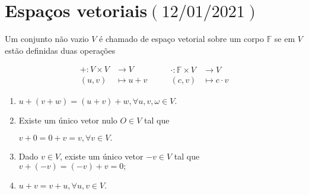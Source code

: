 \chapter{Espaços vetoriais\quad$\left(12/01/2021\right)$}

\begin{definition}
	Um conjunto não vazio $V$ é chamado de espaço vetorial sobre um corpo $\mathbb{F}$ se em $V$ estão definidas duas operações

	\[
		\begin{aligned}
			+\colon V\times V & \longrightarrow V \\
			\left(u,v\right)  & \longmapsto u+v
		\end{aligned}\qquad
		\begin{aligned}
			\cdot\colon\mathbb{F}\times V & \longrightarrow V    \\
			\left(c,v\right)              & \longmapsto c\cdot v
		\end{aligned}
	\]

	\begin{enumerate}[label={(A\arabic*)},leftmargin=0em,itemindent=*]
		\item\label{adição_vetores:1}

		      \begin{math}
			      u+
			      \left(v+w\right)=
			      \left(u+v\right)+
			      w,
			      \forall u,v,\omega\in V.
		      \end{math}

		\item\label{adição_vetores:2}

		      Existe um único vetor nulo $O\in V$ tal que

		      \begin{math}
			      v+0=
			      0+v=
			      v,
			      \forall v\in V.
		      \end{math}

		\item\label{adição_vetores:3}

		      Dado $v\in V$, existe um único vetor $-v\in V$ tal que
		      \begin{math}
			      v+\left(-v\right)=
			      \left(-v\right)+v=
			      0;
		      \end{math}

		\item\label{adição_vetores:4}

		      \begin{math}
			      u+v=
			      v+u,
			      \forall u,v\in V.
		      \end{math}
	\end{enumerate}


\end{definition}
